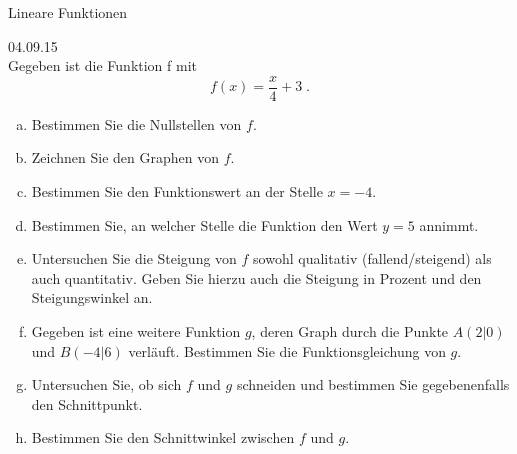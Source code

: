 \documentclass[12pt,fleqn]{article}
\theoremstyle{aufg}
\theoremstyle{bsp}
\begin{document}
 
    \begin{flushleft}
\begin{center}Lineare Funktionen\end{center} 
 04.09.15 \\[2em]Gegeben ist die Funktion f mit\[f(x)=\frac{x}{4} + 3\; . \]\begin{enumerate}[a)] 
\item 
Bestimmen Sie die Nullstellen von $f$. \\ 

\item 
Zeichnen Sie den Graphen von $f$. \\ 

\item 
Bestimmen Sie den Funktionswert an der Stelle $x=-4$. \\ 

\item 
Bestimmen Sie, an welcher Stelle die Funktion den Wert $y=5$ annimmt. \\ 

\item 
Untersuchen Sie die Steigung von $f$ sowohl qualitativ (fallend/steigend) als auch quantitativ. Geben Sie hierzu auch die Steigung in Prozent und den Steigungswinkel an. \\ 

\item 
Gegeben ist eine weitere Funktion $g$, deren Graph durch die Punkte $A(2|0)$ und $B(-4|6)$ verl\"auft. Bestimmen Sie die Funktionsgleichung von $g$. \\ 

\item 
Untersuchen Sie, ob sich $f$ und $g$ schneiden und bestimmen Sie gegebenenfalls den Schnittpunkt. \\ 

\item 
Bestimmen Sie den Schnittwinkel zwischen $f$ und $g$. \\ 

\end{enumerate} 
\end{flushleft} 
\end{document}
